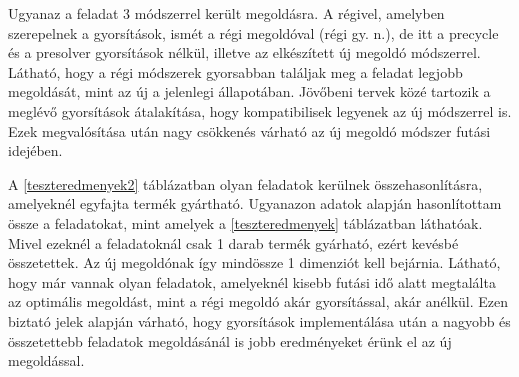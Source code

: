 Ugyanaz a feladat 3 módszerrel került megoldásra.
A régivel, amelyben szerepelnek a gyorsítások, ismét a régi megoldóval (régi gy. n.), de itt a precycle és a presolver gyorsítások nélkül, illetve az elkészített új megoldó módszerrel.
Látható, hogy a régi módszerek gyorsabban találjak meg a feladat legjobb megoldását, mint az új a jelenlegi állapotában.
Jövőbeni tervek közé tartozik a meglévő gyorsítások átalakítása, hogy kompatibilisek legyenek az új módszerrel is.
Ezek megvalósítása után nagy csökkenés várható az új megoldó módszer futási idejében. 

A \ref{teszteredmenyek2} táblázatban olyan feladatok kerülnek összehasonlításra, amelyeknél egyfajta termék gyártható.
Ugyanazon adatok alapján hasonlítottam össze a feladatokat, mint amelyek a \ref{teszteredmenyek} táblázatban láthatóak.
Mivel ezeknél a feladatoknál csak 1 darab termék gyárható, ezért kevésbé összetettek.
Az új megoldónak így mindössze 1 dimenziót kell bejárnia.
Látható, hogy már vannak olyan feladatok, amelyeknél kisebb futási idő alatt megtalálta az optimális megoldást, mint a régi megoldó akár gyorsítással, akár anélkül.
Ezen biztató jelek alapján várható, hogy gyorsítások implementálása után a nagyobb és összetettebb feladatok megoldásánál is jobb eredményeket érünk el az új megoldással.

